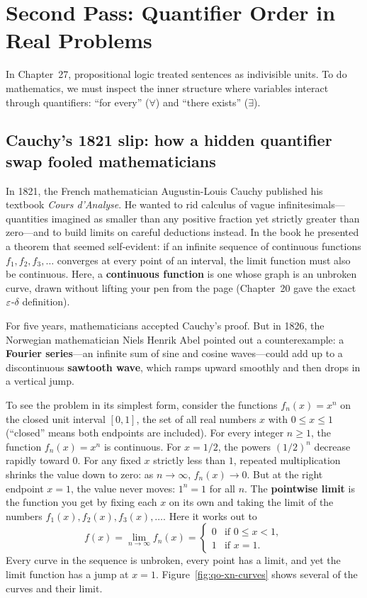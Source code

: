 \section{Second Pass: Quantifier Order in Real Problems}
\chapterline

In Chapter~27, propositional logic treated sentences as indivisible units. To do mathematics, we must inspect the inner structure where variables interact through quantifiers: ``for every'' ($\forall$) and ``there exists'' ($\exists$).

\subsection{Cauchy's 1821 slip: how a hidden quantifier swap fooled mathematicians}

In 1821, the French mathematician Augustin-Louis Cauchy published his textbook \emph{Cours d'Analyse}. He wanted to rid calculus of vague infinitesimals---quantities imagined as smaller than any positive fraction yet strictly greater than zero---and to build limits on careful deductions instead. In the book he presented a theorem that seemed self-evident: if an infinite sequence of continuous functions $f_1, f_2, f_3, \dots$ converges at every point of an interval, the limit function must also be continuous. Here, a \textbf{continuous function} is one whose graph is an unbroken curve, drawn without lifting your pen from the page (Chapter~20 gave the exact $\varepsilon$-$\delta$ definition).

For five years, mathematicians accepted Cauchy's proof. But in 1826, the Norwegian mathematician Niels Henrik Abel pointed out a counterexample: a \textbf{Fourier series}---an infinite sum of sine and cosine waves---could add up to a discontinuous \textbf{sawtooth wave}, which ramps upward smoothly and then drops in a vertical jump.

To see the problem in its simplest form, consider the functions $f_n(x) = x^n$ on the closed unit interval $[0, 1]$, the set of all real numbers $x$ with $0 \le x \le 1$ (``closed'' means both endpoints are included).
For every integer $n \ge 1$, the function $f_n(x) = x^n$ is continuous. For $x = 1/2$, the powers $(1/2)^n$ decrease rapidly toward $0$. For any fixed $x$ strictly less than $1$, repeated multiplication shrinks the value down to zero: as $n \to \infty$, $f_n(x) \to 0$. But at the right endpoint $x = 1$, the value never moves: $1^n = 1$ for all $n$.
The \textbf{pointwise limit} is the function you get by fixing each $x$ on its own and taking the limit of the numbers $f_1(x), f_2(x), f_3(x), \dots$. Here it works out to
\[
f(x) = \lim_{n \to \infty} f_n(x) = \begin{cases}
0 & \text{if } 0 \le x < 1, \\
1 & \text{if } x = 1.
\end{cases}
\]
Every curve in the sequence is unbroken, every point has a limit, and yet the limit function has a jump at $x = 1$. Figure~\ref{fig:qo-xn-curves} shows several of the curves and their limit.

